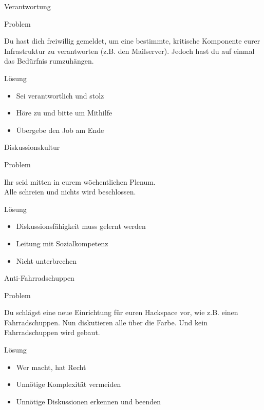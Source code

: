 \documentclass[aspectratio=43]{beamer}
\newcommand{\pattern}[2]{
  \begin{alertblock}{Problem}
    #1
  \end{alertblock}
  \pause
  \begin{exampleblock}{Lösung}
    #2
  \end{exampleblock}
}
\begin{document}
  \begin{frame}{Verantwortung}
    \pattern{
      Du hast dich freiwillig gemeldet, um eine bestimmte, kritische Komponente
      eurer Infrastruktur zu verantworten (z.B. den Mailserver). Jedoch hast du
      auf einmal das Bedürfnis rumzuhängen.
    }{
      \begin{itemize}
        \item{Sei verantwortlich und stolz}
        \pause
        \item{Höre zu und bitte um Mithilfe}
        \pause
        \item{Übergebe den Job am Ende}
      \end{itemize}
    }
  \end{frame}

  \begin{frame}{Diskussionskultur}
    \pattern{
      Ihr seid mitten in eurem wöchentlichen Plenum.\\
      Alle schreien und nichts wird beschlossen.
    }{
      \begin{itemize}
        \item{Diskussionsfähigkeit muss gelernt werden}
        \pause
        \item{Leitung mit Sozialkompetenz}
        \pause
        \item{Nicht unterbrechen}
      \end{itemize}
    }
  \end{frame}

  \begin{frame}{Anti-Fahrradschuppen}
    \pattern{
      Du schlägst eine neue Einrichtung für euren Hackspace vor, wie z.B.
      einen Fahrradschuppen. Nun diskutieren alle über die Farbe. Und kein
      Fahrradschuppen wird gebaut.
    }{
      \begin{itemize}
        \item{Wer macht, hat Recht}
        \pause
        \item{Unnötige Komplexität vermeiden}
        \pause
        \item{Unnötige Diskussionen erkennen und beenden}
      \end{itemize}
    }
  \end{frame}
\end{document}
